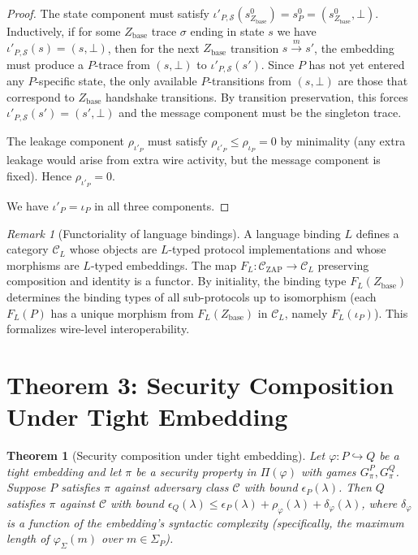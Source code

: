 \documentclass[11pt]{article}
\newtheorem{theorem}{Theorem}
\theoremstyle{definition}
\theoremstyle{remark}
\newtheorem*{remark}{Remark}
\newcommand{\CZ}{\mathcal{C}_{\mathrm{ZAP}}}
\newcommand{\Zb}{Z_{\mathrm{base}}}
\begin{document}
\begin{proof}
The state component must satisfy $\iota'_{P,\mathcal{S}}(s^0_{\Zb}) =
s^0_P = (s^0_{\Zb}, \bot)$. Inductively, if for some $\Zb$ trace
$\sigma$ ending in state $s$ we have
$\iota'_{P,\mathcal{S}}(s) = (s, \bot)$, then for the next $\Zb$
transition $s \xrightarrow{m} s'$, the embedding must produce a
$P$-trace from $(s, \bot)$ to $\iota'_{P,\mathcal{S}}(s')$. Since
$P$ has not yet entered any $P$-specific state, the only available
$P$-transitions from $(s, \bot)$ are those that correspond to $\Zb$
handshake transitions. By transition preservation, this forces
$\iota'_{P,\mathcal{S}}(s') = (s', \bot)$ and the message component
must be the singleton trace.

The leakage component $\rho_{\iota'_P}$ must satisfy
$\rho_{\iota'_P} \le \rho_{\iota_P} = 0$ by minimality (any extra
leakage would arise from extra wire activity, but the message
component is fixed). Hence $\rho_{\iota'_P} = 0$.

We have $\iota'_P = \iota_P$ in all three components. \qedhere
\end{proof}

\begin{remark}[Functoriality of language bindings]
A language binding $L$ defines a category $\mathcal{C}_L$ whose
objects are $L$-typed protocol implementations and whose morphisms
are $L$-typed embeddings. The map $F_L : \CZ \to \mathcal{C}_L$
preserving composition and identity is a functor. By initiality,
the binding type $F_L(\Zb)$ determines the binding types of all
sub-protocols up to isomorphism (each $F_L(P)$ has a unique morphism
from $F_L(\Zb)$ in $\mathcal{C}_L$, namely $F_L(\iota_P)$). This
formalizes wire-level interoperability.
\end{remark}

\section{Theorem 3: Security Composition Under Tight Embedding}
\label{sec:comp-proof}

\begin{theorem}[Security composition under tight embedding]
\label{thm:composition-proof}
Let $\varphi : P \hookrightarrow Q$ be a tight embedding and let
$\pi$ be a security property in $\Pi(\varphi)$ with games
$G_\pi^P, G_\pi^Q$. Suppose $P$ satisfies $\pi$ against adversary
class $\mathcal{C}$ with bound $\epsilon_P(\lambda)$. Then $Q$
satisfies $\pi$ against $\mathcal{C}$ with bound
$\epsilon_Q(\lambda) \le \epsilon_P(\lambda) + \rho_\varphi(\lambda)
+ \delta_\varphi(\lambda)$, where $\delta_\varphi$ is a function of
the embedding's syntactic complexity (specifically, the maximum
length of $\varphi_\Sigma(m)$ over $m \in \Sigma_P$).
\end{theorem}
\end{document}
